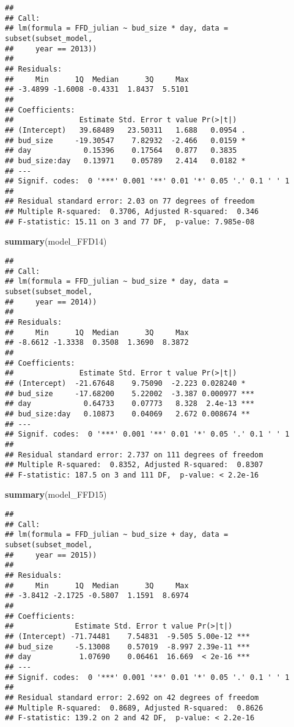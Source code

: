 \documentclass[]{article}
\newenvironment{Shaded}{\begin{snugshade}}{\end{snugshade}}
\newcommand{\KeywordTok}[1]{\textcolor[rgb]{0.13,0.29,0.53}{\textbf{#1}}}
\newcommand{\NormalTok}[1]{#1}
\begin{document}
\begin{verbatim}
## 
## Call:
## lm(formula = FFD_julian ~ bud_size * day, data = subset(subset_model, 
##     year == 2013))
## 
## Residuals:
##     Min      1Q  Median      3Q     Max 
## -3.4899 -1.6008 -0.4331  1.8437  5.5101 
## 
## Coefficients:
##               Estimate Std. Error t value Pr(>|t|)  
## (Intercept)   39.68489   23.50311   1.688   0.0954 .
## bud_size     -19.30547    7.82932  -2.466   0.0159 *
## day            0.15396    0.17564   0.877   0.3835  
## bud_size:day   0.13971    0.05789   2.414   0.0182 *
## ---
## Signif. codes:  0 '***' 0.001 '**' 0.01 '*' 0.05 '.' 0.1 ' ' 1
## 
## Residual standard error: 2.03 on 77 degrees of freedom
## Multiple R-squared:  0.3706, Adjusted R-squared:  0.346 
## F-statistic: 15.11 on 3 and 77 DF,  p-value: 7.985e-08
\end{verbatim}

\begin{Shaded}
\begin{Highlighting}[]
\KeywordTok{summary}\NormalTok{(model_FFD14)}
\end{Highlighting}
\end{Shaded}

\begin{verbatim}
## 
## Call:
## lm(formula = FFD_julian ~ bud_size * day, data = subset(subset_model, 
##     year == 2014))
## 
## Residuals:
##     Min      1Q  Median      3Q     Max 
## -8.6612 -1.3338  0.3508  1.3690  8.3872 
## 
## Coefficients:
##               Estimate Std. Error t value Pr(>|t|)    
## (Intercept)  -21.67648    9.75090  -2.223 0.028240 *  
## bud_size     -17.68200    5.22002  -3.387 0.000977 ***
## day            0.64733    0.07773   8.328  2.4e-13 ***
## bud_size:day   0.10873    0.04069   2.672 0.008674 ** 
## ---
## Signif. codes:  0 '***' 0.001 '**' 0.01 '*' 0.05 '.' 0.1 ' ' 1
## 
## Residual standard error: 2.737 on 111 degrees of freedom
## Multiple R-squared:  0.8352, Adjusted R-squared:  0.8307 
## F-statistic: 187.5 on 3 and 111 DF,  p-value: < 2.2e-16
\end{verbatim}

\begin{Shaded}
\begin{Highlighting}[]
\KeywordTok{summary}\NormalTok{(model_FFD15)}
\end{Highlighting}
\end{Shaded}

\begin{verbatim}
## 
## Call:
## lm(formula = FFD_julian ~ bud_size + day, data = subset(subset_model, 
##     year == 2015))
## 
## Residuals:
##     Min      1Q  Median      3Q     Max 
## -3.8412 -2.1725 -0.5807  1.1591  8.6974 
## 
## Coefficients:
##              Estimate Std. Error t value Pr(>|t|)    
## (Intercept) -71.74481    7.54831  -9.505 5.00e-12 ***
## bud_size     -5.13008    0.57019  -8.997 2.39e-11 ***
## day           1.07690    0.06461  16.669  < 2e-16 ***
## ---
## Signif. codes:  0 '***' 0.001 '**' 0.01 '*' 0.05 '.' 0.1 ' ' 1
## 
## Residual standard error: 2.692 on 42 degrees of freedom
## Multiple R-squared:  0.8689, Adjusted R-squared:  0.8626 
## F-statistic: 139.2 on 2 and 42 DF,  p-value: < 2.2e-16
\end{verbatim}
\end{document}
